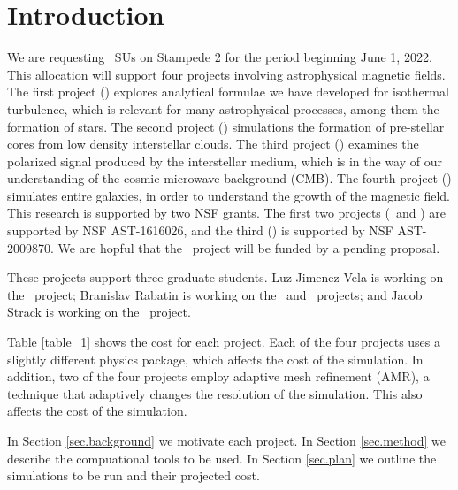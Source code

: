 \section{Introduction}
\label{sec.intro}

We are requesting \SUtotal\ SUs on Stampede 2 for the period beginning June 1,
2022.  This allocation will support four projects involving astrophysical
magnetic fields.  The first project (\nameTurbulence) explores analytical
formulae we have developed for isothermal turbulence, which is relevant for many
astrophysical processes, among them the formation of stars.  The second project
(\nameCores) simulations the formation of pre-stellar cores from low density
interstellar clouds.  The third project (\nameCMB) examines the polarized signal
produced by the interstellar medium, which is in the way of our understanding of
the cosmic microwave background (CMB). The fourth projcet (\nameGalaxies)
simulates entire galaxies, in order to understand the growth of the magnetic
field.
This research is supported by two NSF grants.  The first two projects
(\nameTurbulence\ and \nameCores)  
are
supported by NSF AST-1616026, and the third (\nameCMB) is supported by 
NSF AST-2009870.
We are hopful that the \nameGalaxies\ project will be funded by a pending
proposal.


These projects support three graduate students.  Luz Jimenez Vela is working on
the \nameCores\ project; Branislav Rabatin is working on the \nameTurbulence\
and \nameCMB\ projects; and Jacob Strack is working on the \nameGalaxies\
project.


Table \ref{table_1} shows the cost for each project.  Each of the four projects
uses a slightly different physics package, which affects  the cost of the
simulation.  In addition, two of the four projects employ adaptive mesh
refinement (AMR), a technique that adaptively changes the resolution of the
simulation.  This also affects the cost of the simulation.

In Section
\ref{sec.background} we motivate each project. In Section \ref{sec.method} we
describe the compuational tools to be used.  In Section \ref{sec.plan} we
outline the simulations to be run and their projected cost.  



